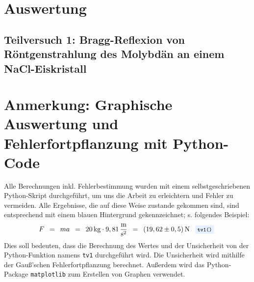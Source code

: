 \documentclass{article}
\newcommand{\widespace}{\enspace}
\newcommand{\wideeq}{\widespace = \widespace}
\newcommand{\result}[2]{
    #1 \, \text{#2}
}
\newcommand{\coderef}[1]{
    \text{
        \enspace
        \footnotesize
        \colorbox{codebg}{\texttt{#1()}}
    }
}
\begin{document}
\newpage

\section{Auswertung}

    \subsection{Teilversuch 1: Bragg-Reflexion von Röntgenstrahlung des Molybdän an einem NaCl-Eiskristall}

    \newpage

\section{Anmerkung: Graphische Auswertung und Fehlerfortpflanzung mit Python-Code}

Alle Berechnungen inkl. Fehlerbestimmung wurden mit einem selbstgeschriebenen
Python-Skript durchgeführt, um uns die Arbeit zu erleichtern und Fehler zu
vermeiden. Alle Ergebnisse, die auf diese Weise zustande gekommen sind,
sind entsprechend mit einem \colorbox{codebg}{blauen Hintergrund} gekennzeichnet;
s. folgendes Beispiel:
\[
    F \wideeq ma \wideeq \result{20}{kg} \cdot 9,81 \, \frac{\text m}{\text s^2}
    \wideeq \result{(19,62 \pm 0,5)}{N} \coderef{tv1}
\]
Dies soll bedeuten, dass die Berechnung des Wertes und der Unsicherheit von der
Python-Funktion namens \verb|tv1| durchgeführt wird.
Die Unsicherheit wird mithilfe der Gauß'schen Fehlerfortpflanzung berechnet.
Außerdem wird das Python-Package \texttt{matplotlib} zum Erstellen
von Graphen verwendet.


\end{document}
